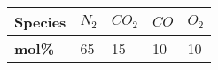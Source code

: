 \begin{table}[H]
\centering
\begin{tabularx}{0.4\textwidth}{|l|X|X|X|X|}
\hline
\textbf{Species} & $N_2$ & $CO_2$ & $CO$ & $O_2$  \\
\hline
\textbf{mol\%} & 65 & 15 & 10 & 10 \\
\hline
\end{tabularx}
\caption*{}
\label{tables:59}
\end{table}